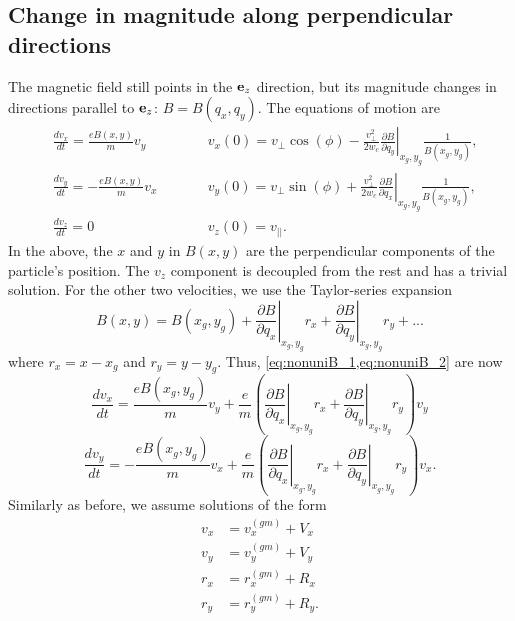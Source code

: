 \documentclass[oneside,a4paper,11pt]{report}
\begin{document}
\subsection{Change in magnitude along perpendicular directions}
The magnetic field still points in the $\mathbf{e}_z$ direction, but its magnitude changes in directions parallel to $\mathbf{e}_z$: $B = B(q_x,q_y)$. The equations of motion are
\begin{subequations}
\begin{alignat}{2}
    &\frac{d v_x}{dt} = \frac{eB(x,y)}{m} v_y  \qquad && v_x(0) = v_\perp \cos(\phi) -\frac{v^2_\perp}{2 w_c} \left . \frac{\partial B}{\partial q_y} \right |_{x_g,y_g} \frac{1}{B(x_g,y_g)}, \label{eq:nonuniB_1} \\
    &\frac{d v_y}{dt} = -\frac{eB(x,y)}{m} v_x  \qquad && v_y(0) = v_\perp \sin(\phi) + \frac{v^2_\perp}{2 w_c} \left . \frac{\partial B}{\partial q_x} \right |_{x_g,y_g} \frac{1}{B(x_g,y_g)}, \label{eq:nonuniB_2} \\
    &\frac{d v_z}{dt} = 0  \qquad && v_z(0) = v_{||}. \label{eq:nonuniB_3}
\end{alignat}
\end{subequations}
In the above, the $x$ and $y$ in $B(x,y)$ are the perpendicular components of the particle's position. The $v_z$ component is decoupled from the rest and has a trivial solution. For the other two velocities, we use the Taylor-series expansion
\begin{equation}
    B(x,y) = B(x_g, y_g) + \left . \frac{\partial B}{\partial q_x} \right |_{x_g,y_g} r_x + \left . \frac{\partial B}{\partial q_y} \right |_{x_g,y_g} r_y + ...
\end{equation}
where $r_x = x - x_g$ and $r_y = y - y_g$. Thus, \cref{eq:nonuniB_1,eq:nonuniB_2} are now
\begin{equation}
    \frac{ d v_x}{dt} = \frac{e B(x_g,y_g)}{m} v_y + \frac{e}{m} \left ( \left . \frac{\partial B}{\partial q_x} \right|_{x_g,y_g} r_x + \left . \frac{\partial B}{\partial q_y} \right |_{x_g,y_g} r_y \right) v_y
\end{equation}
\begin{equation}
    \frac{ d v_y}{dt} = -\frac{e B(x_g,y_g)}{m} v_x + \frac{e}{m} \left ( \left . \frac{\partial B}{\partial q_x} \right|_{x_g,y_g} r_x + \left . \frac{\partial B}{\partial q_y} \right |_{x_g,y_g} r_y \right ) v_x.
\end{equation}
Similarly as before, we assume solutions of the form 
\begin{align}
v_x &= v_x^{(gm)} + V_x \nonumber \\
v_y &= v_y^{(gm)} + V_y \nonumber \\
r_x &= r_x^{(gm)} + R_x \nonumber \\
r_y &= r_y^{(gm)} + R_y.
\end{align}
\end{document}
